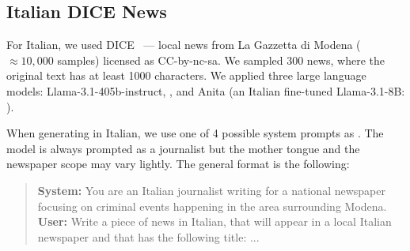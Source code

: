 

\subsection{Italian DICE News}
For Italian, we used DICE~\citep{bonisoli2023} --- local news from La Gazzetta di Modena ($\approx 10,000$ samples) licensed as CC-by-nc-sa.
We sampled 300 news, where the original text has at least 1000 characters. 
We applied three large language models: Llama-3.1-405b-instruct, \gptfouro, and Anita (an Italian fine-tuned Llama-3.1-8B: \citet{polignano2024advanced}). 


When generating in Italian, we use one of 4 possible system prompts as .
The model is always prompted as a journalist but the mother tongue and the newspaper scope may vary lightly.
The general format is the following:
\begin{quote}
\textbf{System:} You are an Italian journalist writing for a national newspaper focusing on criminal events
happening in the area surrounding Modena. \\
\textbf{User:} Write a piece of news in Italian, that will appear in a local Italian newspaper and that has the following title: ...
\end{quote}


